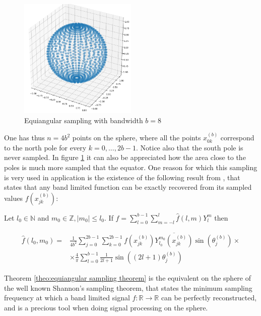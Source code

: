 \begin{figure}[h]
	\centering
	\includegraphics[width=0.5\textwidth]{figs/Chapter3/equiangular.png}
	\caption{\label{fig:equiangular sampling}Equiangular sampling with bandwidth $b=8$}
\end{figure}
One has thus $n=4b^2$ points on the sphere, where all the points $x_{0 k}^{(b)}$ correspond to the north pole for every $k=0, ..., 2b-1$. Notice also that the south pole is never sampled. In figure \ref{fig:equiangular sampling} it can also be appreciated how the area close to the poles is much more sampled that the equator. One reason for which this sampling is very used in application is the existence of the following result from \cite{Driscoll:1994:CFT:184069.184073}, that states that any band limited function can be exactly recovered from its sampled values $f\left(x_{j k}^{(b)}\right)$:
\vspace{0.5cm}
\begin{theorem}\label{theo:equiangular sampling theorem}
	Let \(l_{0} \in \mathbb{N}\) and \(m_{0} \in \mathbb{Z},\left|m_{0}\right| \leq l_{0} .\) If \(f=\sum_{l=0}^{b-1} \sum_{m=-l}^{l} \widehat{f}(l, m) Y_{l}^{m}\)
	then
	
	$$
	\begin{aligned} \widehat{f}\left(l_{0}, m_{0}\right)=& \frac{1}{4 b^{2}} \sum_{j=0}^{2 b-1} \sum_{k=0}^{2 b-1} f\left(x_{j k}^{(b)}\right) \overline{Y_{l_{0}}^{m_{0}}\left(x_{j k}^{(b)}\right)} \sin \left(\theta_{j}^{(b)}\right) \times \\ & \times \frac{4}{\pi} \sum_{l=0}^{b-1} \frac{1}{2 l+1} \sin \left((2 l+1) \theta_{j}^{(b)}\right) \end{aligned}
	$$
\end{theorem}
\vspace{0.5cm}
Theorem \ref{theo:equiangular sampling theorem} is the equivalent on the sphere of the well known Shannon's sampling theorem, that states the minimum sampling frequency at which a band limited signal $f:\mathbb R \to \mathbb R$ can be perfectly reconstructed, and is a precious tool when doing signal processing on the sphere.

